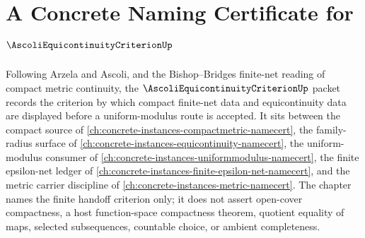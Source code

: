 \chapter{A Concrete Naming Certificate for $\AscoliEquicontinuityCriterionUp$}
\label{ch:concrete-instances-ascoli-equicontinuity-criterion-namecert}

Following Arzela and Ascoli, and the Bishop--Bridges finite-net reading of compact metric continuity, the $\AscoliEquicontinuityCriterionUp$ packet records the criterion by which compact finite-net data and equicontinuity data are displayed before a uniform-modulus route is accepted. It sits between the compact source of \autoref{ch:concrete-instances-compactmetric-namecert}, the family-radius surface of \autoref{ch:concrete-instances-equicontinuity-namecert}, the uniform-modulus consumer of \autoref{ch:concrete-instances-uniformmodulus-namecert}, the finite epsilon-net ledger of \autoref{ch:concrete-instances-finite-epsilon-net-namecert}, and the metric carrier discipline of \autoref{ch:concrete-instances-metric-namecert}. The chapter names the finite handoff criterion only; it does not assert open-cover compactness, a host function-space compactness theorem, quotient equality of maps, selected subsequences, countable choice, or ambient completeness.

